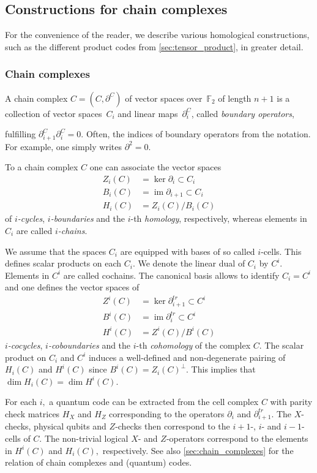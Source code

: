\documentclass[amsmath, amssymb, floatfix, reprint, twocolumn, notitlepage, 10pt]{revtex4-1}
\newcommand{\change}{}
\newcommand{\im}{\operatorname{im}}
\begin{document}
\subsection{Constructions for chain complexes}\label{app:chaincomplexes}
For the convenience of the reader, we describe various homological constructions, such as the different product codes from \cref{sec:tensor_product}, in greater detail.
\subsubsection{Chain complexes}

A chain complex $C=(C,\partial^C)$  of vector spaces over~$\mathbb{F}_2$ of length $n+1$ is a collection of vector spaces~$C_i$ and linear maps~$\partial^C_i$, called \emph{boundary operators},
\begin{center}
\end{center}
fulfilling $\partial^C_{i+1}\partial^C_i=0.$
Often, the indices of boundary operators from the notation. For example, one simply writes $\partial^2=0.$ 

{\change To a chain complex $C$ one can associate the vector spaces
\begin{align*}
Z_i(C) &= \ker \partial_i\subset C_i\\
B_i(C) &= \im \partial_{i+1}\subset C_i\\
H_i(C) &=Z_i(C)/B_i(C)
\end{align*}
of  \emph{$i$-cycles}, \emph{$i$-boundaries} and the $i$-th \emph{homology}, respectively, whereas elements in $C_i$ are called \emph{$i$-chains}.

We assume that the spaces $C_i$ are equipped with bases of so called $i$-cells. This defines scalar products on each $C_i.$
We denote the linear dual of $C_i$ by  $C^i.$ Elements in $C^i$ are called cochains. The canonical basis allows to identify $C_i=C^i$ and one defines the vector spaces of
\begin{align*}
Z^i(C) &= \ker \partial_{i+1}^{tr}\subset C^i\\
B^i(C) &= \im \partial_{i}^{tr}\subset C^i\\
H^i(C) &=Z^i(C)/B^i(C)
\end{align*}
\emph{$i$-cocycles}, \emph{$i$-coboundaries} and the $i$-th \emph{cohomology} of the complex $C.$
The scalar product on $C_i$ and $C^i$ induces a well-defined and non-degenerate pairing of $H_i(C)$ and $H^i(C)$ since
$B^i(C)=Z_i(C)^\perp.$ This implies that $\dim H_i(C)=\dim H^i(C).$

For each $i,$ a quantum code can be extracted from the cell complex $C$ with parity check matrices $H_X$ and $H_Z$ corresponding to the operators $\partial_{i}$ and $\partial_{i+1}^{tr}.$ 
The $X$-checks, physical qubits and $Z$-checks then correspond to the $i+1$-, $i$- and $i-1$-cells of $C.$ 
The non-trivial logical $X$- and $Z$-operators correspond to the elements in $H^i(C)$ and $H_i(C),$ respectively.
See also \cref{sec:chain_complexes} for the relation of chain complexes and (quantum) codes.}
\end{document}

